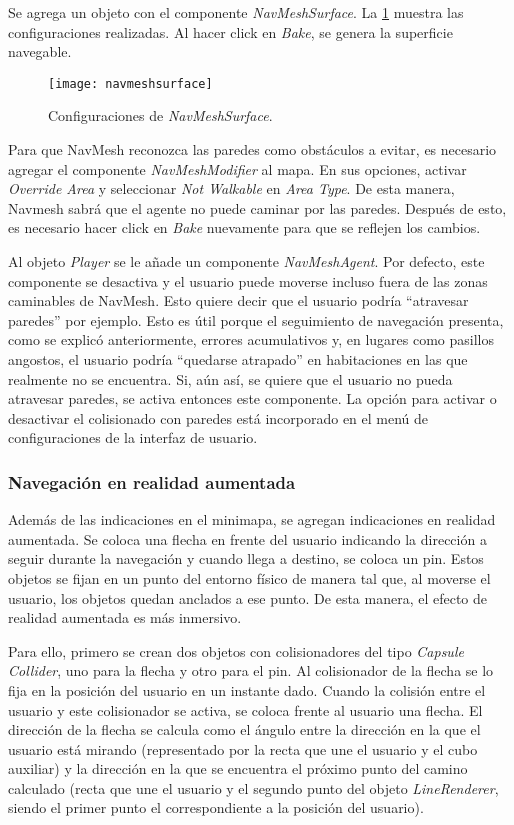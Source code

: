 \documentclass{article}
\newenvironment{standalone}{\begin{preview}}{\end{preview}}
\begin{document}
\begin{standalone}
Se agrega un objeto con el componente \textit{NavMeshSurface}.
La \cref{fig:navmeshsurface} muestra las configuraciones realizadas.
Al hacer click en \textit{Bake}, se genera la superficie navegable.

\begin{figure}[ht!]
  \centering
  \texttt{[image: navmeshsurface]}
  \caption{Configuraciones de \textit{NavMeshSurface}.}
  \label{fig:navmeshsurface}
\end{figure}

Para que NavMesh reconozca las paredes como obstáculos a evitar, es necesario agregar el componente \textit{NavMeshModifier} al mapa.
En sus opciones, activar \textit{Override Area} y seleccionar \textit{Not Walkable} en \textit{Area Type}.
De esta manera, Navmesh sabrá que el agente no puede caminar por las paredes.
Después de esto, es necesario hacer click en \textit{Bake} nuevamente para que se reflejen los cambios.

Al objeto \textit{Player} se le añade un componente \textit{NavMeshAgent}.
Por defecto, este componente se desactiva y el usuario puede moverse incluso fuera de las zonas caminables de NavMesh.
Esto quiere decir que el usuario podría ``atravesar paredes'' por ejemplo.
Esto es útil porque el seguimiento de navegación presenta, como se explicó anteriormente, errores acumulativos y, en lugares como pasillos angostos, el usuario podría ``quedarse atrapado'' en habitaciones en las que realmente no se encuentra.
Si, aún así, se quiere que el usuario no pueda atravesar paredes, se activa entonces este componente.
La opción para activar o desactivar el colisionado con paredes está incorporado en el menú de configuraciones de la interfaz de usuario.

\subsubsection{Navegación en realidad aumentada}

Además de las indicaciones en el minimapa, se agregan indicaciones en realidad aumentada.
Se coloca una flecha en frente del usuario indicando la dirección a seguir durante la navegación y cuando llega a destino, se coloca un pin.
Estos objetos se fijan en un punto del entorno físico de manera tal que, al moverse el usuario, los objetos quedan anclados a ese punto.
De esta manera, el efecto de realidad aumentada es más inmersivo.

Para ello, primero se crean dos objetos con colisionadores del tipo \textit{Capsule Collider}, uno para la flecha y otro para el pin.
Al colisionador de la flecha se lo fija en la posición del usuario en un instante dado.
Cuando la colisión entre el usuario y este colisionador se activa, se coloca frente al usuario una flecha.
El dirección de la flecha se calcula como el ángulo entre la dirección en la que el usuario está mirando (representado por la recta que une el usuario y el cubo auxiliar) y la dirección en la que se encuentra el próximo punto del camino calculado (recta que une el usuario y el segundo punto del objeto \textit{LineRenderer}, siendo el primer punto el correspondiente a la posición del usuario).


\end{standalone}
\end{document}

